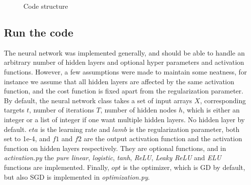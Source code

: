\begin{figure} [H]
\centering
{}
\caption{Code structure}
\label{fig:codestructure}
\end{figure}

\subsection{Run the code}
The neural network was implemented generally, and should be able to handle an arbitrary number of hidden layers and optional hyper parameters and activation functions. However, a few assumptions were made to maintain some neatness, for instance we assume that all hidden layers are affected by the same activation function, and the cost function is fixed apart from the regularization parameter. By default, the neural network class takes a set of input arrays $X$, corresponding targets $t$, number of iterations $T$, number of hidden nodes $h$, which is either an integer or a list of integer if one want multiple hidden layers. No hidden layer by default. $eta$ is the learning rate and $lamb$ is the regularization parameter, both set to 1e-4, and $f1$ and $f2$ are the output activation function and the activation function on hidden layers respectively. They are optional functions, and in \textit{activation.py} the \textit{pure linear}, \textit{logistic}, \textit{tanh}, \textit{ReLU}, \textit{Leaky ReLU} and \textit{ELU} functions are implemented. Finally, $opt$ is the optimizer, which is GD by default, but also SGD is implemented in \textit{optimization.py}.

